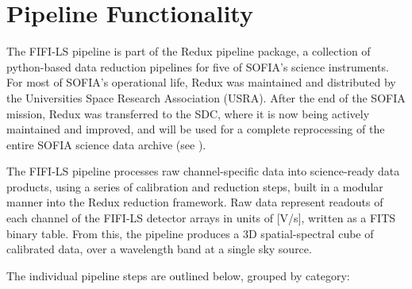 \documentclass[11pt,twoside]{article}
\begin{document}
\section{Pipeline Functionality}
The FIFI-LS pipeline is part of the Redux pipeline package, a collection of python-based
data reduction pipelines for five of SOFIA's science instruments. For most of SOFIA's
operational life, Redux was maintained and distributed by the Universities Space Research Association (USRA).
After the end of the SOFIA mission, Redux was transferred to the SDC, where it is now being actively maintained and improved,
and will be used for a complete reprocessing of the entire SOFIA science data archive (see \citet{P604_adassxxxvi}).

The FIFI-LS pipeline processes raw channel-specific data into science-ready data products,
using a series of calibration and reduction steps, built in a modular manner into the Redux
reduction framework. Raw data represent readouts of each channel of the FIFI-LS detector
arrays in units of [V/s], written as a FITS binary table. From this, the pipeline
produces a 3D spatial-spectral cube of calibrated data, over a wavelength band
at a single sky source.

The individual pipeline steps are outlined below, grouped by category:
\end{document}
